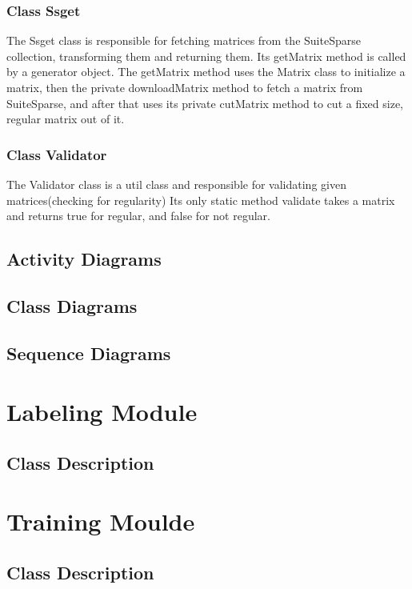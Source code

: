 \documentclass[parskip=full]{scrartcl}
\begin{document}
\subsubsection{Class Ssget}
The Ssget class is responsible for fetching matrices from the SuiteSparse collection, transforming them and returning them.
Its getMatrix method is called by a generator object.
The getMatrix method uses the Matrix class to initialize a matrix, then the private downloadMatrix method to fetch a matrix from SuiteSparse, and after that uses its private cutMatrix method to cut a fixed size, regular matrix out of it.

\subsubsection{Class Validator}
The Validator class is a util class and responsible for validating given matrices(checking for regularity)
 Its only static method validate takes a matrix and returns true for regular, and false for not regular.

\subsection{Activity Diagrams}

\subsection{Class Diagrams}

\subsection{Sequence Diagrams}


\section{Labeling Module}

\subsection{Class Description}

\section{Training Moulde}

\subsection{Class Description}
\end{document}
